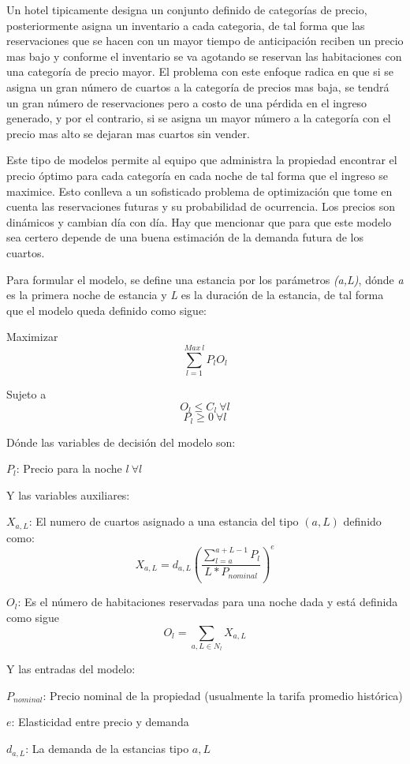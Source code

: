 {Un hotel tipicamente designa un conjunto definido de categorías de precio, posteriormente asigna un inventario a cada categoria, de tal forma que las reservaciones que se hacen con un mayor tiempo de anticipación reciben un precio mas bajo y conforme el inventario se va agotando se reservan las habitaciones con una categoría de precio mayor. El problema con este enfoque radica en que si se asigna un gran número de cuartos a la categoría de precios mas baja, se tendrá un gran número de reservaciones pero a costo de una pérdida en el ingreso generado, y por el contrario, si se asigna un mayor número a la categoría con el precio mas alto se dejaran mas cuartos sin vender.

Este tipo de modelos permite al equipo que administra la propiedad encontrar el precio óptimo para cada categoría en cada noche de tal forma que el ingreso se maximice. Esto conlleva a un sofisticado problema de optimización que tome en cuenta las reservaciones futuras y su probabilidad de ocurrencia. Los precios son dinámicos y cambian día con día. Hay que mencionar que para que este modelo sea certero depende de una buena estimación de la demanda futura de los cuartos.

Para formular el modelo, se define una estancia por los parámetros \emph{(a,L)}, dónde \emph{a} es la primera noche de estancia y \emph{L} es la duración de la estancia, de tal forma que el modelo queda definido como sigue:

Maximizar $$\sum_{l=1}^{Max\ l} P_l O_l$$

Sujeto a $$O_l \leq C_l\  \forall l$$ $$P_l \geq 0 \ \forall l$$

Dónde las variables de decisión del modelo son:

$P_l$: Precio para la noche $l\ \forall l$

Y las variables auxiliares:

$X_{a,L}$: El numero de cuartos asignado a una estancia del tipo $(a,L)$ definido como: $$X_{a,L} = d_{a,L}(\frac{\sum_{l=a}^{a+L-1} P_l}{L*P_{nominal}})^e$$

$O_l$: Es el número de habitaciones reservadas para una noche dada y está definida como sigue $$O_l = \sum_{a,L\in N_l} X_{a,L}$$

Y las entradas del modelo:

$P_{nominal}$: Precio nominal de la propiedad (usualmente la tarifa promedio histórica)

$e$: Elasticidad entre precio y demanda

$d_{a,L}$: La demanda de la estancias tipo $a,L$

}
